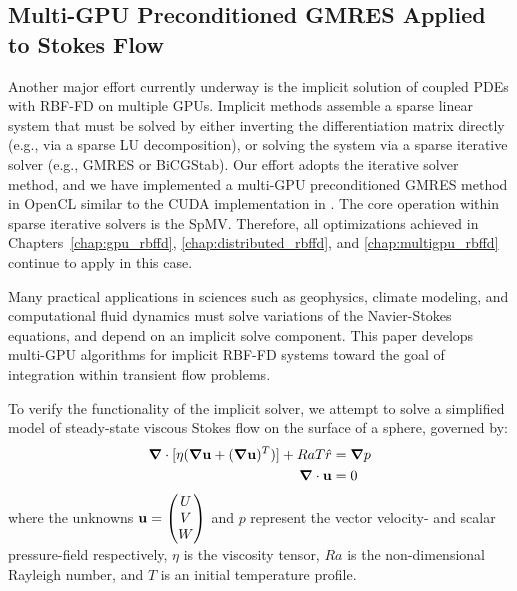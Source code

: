 
\subsection{Multi-GPU Preconditioned GMRES Applied to Stokes Flow}

%


Another major effort currently underway is the implicit solution of coupled PDEs with RBF-FD on multiple GPUs. Implicit methods assemble a sparse linear system that must be solved by either inverting the differentiation matrix directly (e.g., via a sparse LU decomposition), or solving the system via a sparse iterative solver (e.g., GMRES or BiCGStab).
Our effort adopts the iterative solver method, and we have implemented a multi-GPU preconditioned GMRES method in OpenCL similar to the CUDA implementation in \cite{Bahi2011}. The core operation within sparse iterative solvers is the SpMV. Therefore, all optimizations achieved in Chapters~\ref{chap:gpu_rbffd}, \ref{chap:distributed_rbffd}, and \ref{chap:multigpu_rbffd} continue to apply in this case. 

Many practical applications in sciences such as geophysics, climate modeling, and computational fluid dynamics must solve variations of the Navier-Stokes equations, and depend on an implicit solve component. This paper develops multi-GPU algorithms for implicit RBF-FD systems toward the goal of integration within transient flow problems.

To verify the functionality of the implicit solver, we attempt to solve a simplified model of steady-state viscous Stokes flow on the surface of a sphere, governed by: 
  \begin{align}
\mbox{\boldmath$ \nabla $} \cdot [\eta(\mbox{\boldmath$ \nabla $} \mathbf{u} + (\mbox{\boldmath$ \nabla $} \mathbf{u})^T)] + Ra T \hat{r} & = \mbox{\boldmath$ \nabla $} p \label{eq:stokes_momentum} \\
\mbox{\boldmath$ \nabla $} \cdot \mathbf{u} & = 0 \label{eq:stokes_continuity} 
\end{align}
where the unknowns $\mathbf{u} = \begin{pmatrix} U \\ V \\ W\end{pmatrix}$ and $p$ represent the vector velocity- and scalar pressure-field respectively, $\eta$ is the viscosity tensor, $Ra$ is the non-dimensional Rayleigh number, and $T$ is an initial temperature profile. 

